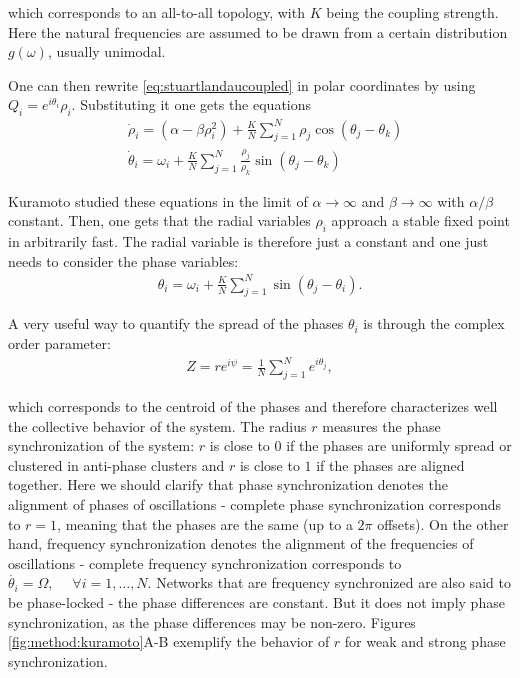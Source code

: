 which corresponds to an all-to-all topology, with $K$ being the coupling strength. Here the natural frequencies are assumed to be drawn from a certain distribution $g(\omega)$, usually unimodal.

One can then rewrite \eqref{eq:stuartlandaucoupled} in polar coordinates by using $Q_i = e^{i \theta_i} \rho_i$. Substituting it one gets the equations 
\begin{align}
    &\dot{\rho}_i = (\alpha - \beta \rho_i^2) + \frac{K}{N} \sum_{j=1}^{N} \rho_j \cos(\theta_j - \theta_k) \\
    &\dot{\theta}_i = \omega_i + \frac{K}{N}\sum_{j=1}^{N} \frac{\rho_j}{\rho_k} \sin(\theta_j - \theta_k)
\end{align}

Kuramoto studied these equations in the limit of $\alpha\to\infty$ and $\beta\to\infty$ with $\alpha/\beta$ constant. Then, one gets that the radial variables $\rho_i$ approach a stable fixed point in arbitrarily fast. The radial variable is therefore just a constant and one just needs to consider the phase variables: 
%
\begin{align}
    \theta_i = \omega_i + \frac{K}{N} \sum_{j=1}^{N}\sin(\theta_j-\theta_i).
    \label{eq:kuramoto-og}
\end{align}

A very useful way to quantify the spread of the phases $\theta_i$ is through the complex order parameter:
\begin{align}
    Z = r e^{i\psi} = \frac{1}{N} \sum_{j=1}^{N} e^{i \theta_j},
    \label{eq:kuramoto-order-parameter}
\end{align}

which corresponds to the centroid of the phases and therefore characterizes well the collective behavior of the system. The radius $r$ measures the phase synchronization of the system: $r$ is close to $0$ if the phases are uniformly spread or clustered in anti-phase clusters and $r$ is close to $1$ if the phases are aligned together. Here we should clarify that phase synchronization denotes the alignment of phases of oscillations - complete phase synchronization corresponds to $r=1$, meaning that the phases are the same (up to a $2\pi$ offsets). On the other hand, frequency synchronization denotes the alignment of the frequencies of oscillations - complete frequency synchronization corresponds to $\dot{\theta_i} = \Omega, \; \quad \forall i=1,\ldots, N$. Networks that are frequency synchronized are also said to be phase-locked - the phase differences are constant. But it does not imply phase synchronization, as the phase differences may be non-zero. Figures \ref{fig:method:kuramoto}A-B exemplify the behavior of $r$ for weak and strong phase synchronization.

